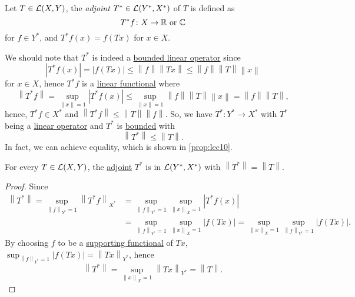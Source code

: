 \begin{definition}\label{def:adjoint-op}
	Let \(T\in \mathcal{\MakeUppercase{l}} (X, Y)\), the \emph{adjoint} \(T^{\ast} \in \mathcal{\MakeUppercase{l}} (Y^{\ast} , X^{\ast} )\) of \(T\) is defined as
	\[
		T^{\ast} f\colon X\to \mathbb{\MakeUppercase{r}} \text{ or }\mathbb{\MakeUppercase{c}}
	\]
	for \(f\in Y^{\ast}\), and \(T^{\ast} f(x) = f(Tx)\) for \(x\in X\).
\end{definition}

We should note that \(T^{\ast} \) is indeed a \hyperref[def:bounded-linear-op]{bounded linear operator} since
\[
	\left\vert T^{\ast} f(x) \right\vert = \left\vert f(Tx) \right\vert \leq \left\lVert f\right\rVert \left\lVert Tx\right\rVert \leq \left\lVert f\right\rVert \left\lVert T\right\rVert \left\lVert x\right\rVert
\]
for \(x\in X\), hence \(T^{\ast} f\) is a \hyperref[def:linear-functional]{linear functional} where
\[
	\left\lVert T^{\ast} f\right\rVert = \sup_{\left\lVert x\right\rVert = 1} \left\vert T^{\ast} f(x) \right\vert \leq \sup _{\left\lVert x\right\rVert = 1}\left\lVert f\right\rVert \left\lVert T\right\rVert \left\lVert x\right\rVert = \left\lVert f\right\rVert \left\lVert T\right\rVert,
\]
hence, \(T^{\ast} f\in X^{\ast} \) and \(\left\lVert T^{\ast} f\right\rVert \leq \left\lVert T\right\rVert \left\lVert f\right\rVert \). So, we have \(T^{\ast} \colon Y^{\ast} \to X^{\ast} \) with \(T^{\ast} \) being a \hyperref[def:linear-op]{linear operator} and \(T^{\ast} \) is \hyperref[def:bounded-linear-op]{bounded} with
\[
	\left\lVert T^{\ast} \right\rVert \leq \left\lVert T\right\rVert .
\]
In fact, we can achieve equality, which is shown in \autoref{prop:lec10}.

\begin{proposition}\label{prop:lec10}
	For every \(T\in \mathcal{\MakeUppercase{l}} (X,Y)\), the \hyperref[def:adjoint-op]{adjoint} \(T^{\ast} \) is in \(\mathcal{\MakeUppercase{l}} (Y^{\ast} , X^{\ast} )\) with \(\left\lVert T^{\ast} \right\rVert = \left\lVert T\right\rVert \).
\end{proposition}
\begin{proof}
	Since
	\[
		\begin{split}
			\left\lVert T^{\ast} \right\rVert
			= \sup _{\left\lVert f\right\rVert _{Y^{\ast} }= 1}\left\lVert T^{\ast} f\right\rVert _{X^{\ast} }
			&= \sup _{\left\lVert f\right\rVert _{Y^{\ast} } = 1} \sup _{\left\lVert x\right\rVert _X = 1}\left\vert T^{\ast} f(x) \right\vert\\
			&= \sup_{\left\lVert f\right\rVert _{Y^{\ast} }= 1}\sup _{\left\lVert x\right\rVert _X = 1} \left\vert f(Tx) \right\vert
			= \sup _{\left\lVert x\right\rVert _X = 1} \sup _{\left\lVert f\right\rVert _{Y^{\ast} } = 1} \left\vert f(Tx) \right\vert.
		\end{split}
	\]
	By choosing \(f\) to be a \hyperref[thm:supporting-functional]{supporting functional} of \(Tx\), \(\sup _{\left\lVert f\right\rVert _{Y^{\ast} }=1}\left\vert f(Tx) \right\vert = \left\lVert Tx\right\rVert _{Y^{\ast} }\), hence
	\[
		\left\lVert T^{\ast} \right\rVert = \sup _{\left\lVert x\right\rVert _X = 1} \left\lVert Tx\right\rVert _{Y^{\ast} }= \left\lVert T\right\rVert.
	\]
\end{proof}

